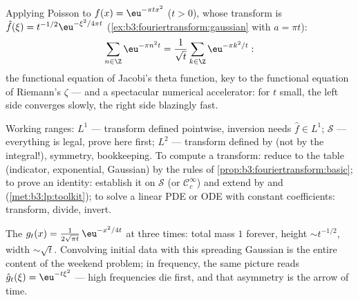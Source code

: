 \begin{example}
\label{ex:b3:fouriertransform:theta}
Applying Poisson to $f(x) = \eu^{-\pi tx^2}$ ($t > 0$), whose
transform is $\hat f(\xi) = t^{-1/2}\eu^{-\xi^2/4\pi t}$
(\cref{ex:b3:fouriertransform:gaussian} with $a = \pi t$):
\[
\sum_{n\in\Z}\eu^{-\pi n^2t}
= \frac1{\sqrt t}\sum_{k\in\Z}\eu^{-\pi k^2/t} :
\]
the functional equation of Jacobi's theta function, key to the
functional equation of Riemann's $\zeta$ --- and a spectacular
numerical accelerator: for $t$ small, the left side converges
slowly, the right side blazingly fast.
\end{example}

\begin{method}\label{met:b3:fouriertransform:method}
Working ranges: $L^1$ --- transform defined pointwise,
inversion needs $\hat f \in L^1$; $\mathcal S$ --- everything
is legal, prove here first; $L^2$ --- transform defined by
 (not by the integral!),  symmetry, 
bookkeeping. To compute a transform: reduce to the table
(indicator, exponential, Gaussian) by the rules of
\cref{prop:b3:fouriertransform:basic}; to prove an identity:
establish it on $\mathcal S$ (or $\mathcal C_c^\infty$) and
extend by  and 
(\cref{met:b3:lp:toolkit}); to solve a linear PDE or ODE with
constant coefficients: transform, divide, invert.
\end{method}

\begin{omfigure}

{\small The  $g_t(x) =
\frac1{2\sqrt{\pi t}}\,\eu^{-x^2/4t}$ at three times: total
mass $1$ forever, height $\sim t^{-1/2}$, width $\sim
\sqrt t$. Convolving initial data with this spreading
Gaussian is the entire content of the weekend problem; in
frequency, the same picture reads
$\hat g_t(\xi) = \eu^{-t\xi^2}$ --- high frequencies die
first, and that asymmetry is the arrow of time.}
\end{omfigure}

